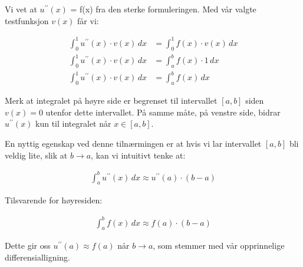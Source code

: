 Vi vet at $u^{\prime\prime}(x)$ = f(x) fra den sterke formuleringen. Med vår valgte testfunksjon $v(x)$ får vi:

\begin{align*}
    \int_0^1 u^{\prime\prime}(x) \cdot v(x) \, dx & = \int_0^1 f(x) \cdot v(x) \, dx \\
    \int_0^1 u^{\prime\prime}(x) \cdot v(x) \, dx & = \int_a^b f(x) \cdot 1 \, dx    \\
    \int_0^1 u^{\prime\prime}(x) \cdot v(x) \, dx & = \int_a^b f(x) \, dx
\end{align*}

Merk at integralet på høyre side er begrenset til intervallet $[a,b]$ siden $v(x)=0$ utenfor dette intervallet. På samme måte, på venstre side, bidrar $u^{\prime\prime}(x)$ kun til integralet når $x \in [a,b]$.

En nyttig egenskap ved denne tilnærmingen er at hvis vi lar intervallet $[a,b]$ bli veldig lite, slik at $b \rightarrow a$, kan vi intuitivt tenke at:

\begin{align*}
    \int_a^b u^{\prime\prime}(x) \, dx \approx u^{\prime\prime}(a) \cdot (b-a)
\end{align*}

Tilsvarende for høyresiden:

\begin{align*}
    \int_a^b f(x) \, dx \approx f(a) \cdot (b-a)
\end{align*}

Dette gir oss $u^{\prime\prime}(a) \approx f(a)$ når $b \rightarrow a$, som stemmer med vår opprinnelige differensialligning.

